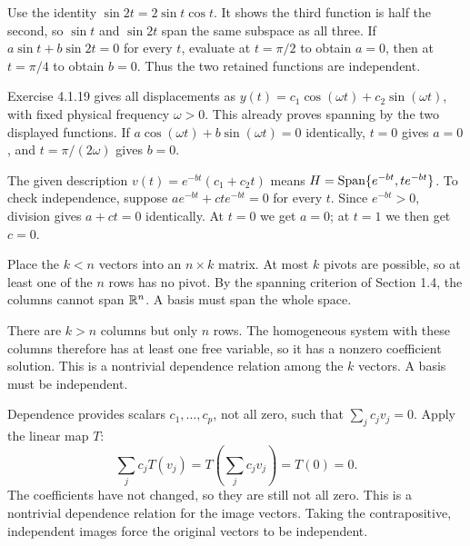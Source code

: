 Use the identity $\sin2t=2\sin t\cos t$. It shows the third function
is half the second, so $\sin t$ and $\sin2t$ span the same subspace
as all three. If $a\sin t+b\sin2t=0$ for every $t$, evaluate at
$t=\pi/2$ to obtain $a=0$, then at $t=\pi/4$ to obtain $b=0$.
Thus the two retained functions are independent.

Exercise 4.1.19 gives all displacements as
$y(t)=c_1\cos(\omega t)+c_2\sin(\omega t)$, with fixed physical
frequency $\omega>0$. This already proves spanning by the two displayed
functions. If $a\cos(\omega t)+b\sin(\omega t)=0$ identically,
$t=0$ gives $a=0$, and $t=\pi/(2\omega)$ gives $b=0$.

The given description $v(t)=e^{-bt}(c_1+c_2t)$ means
$H=\operatorname{Span}\{e^{-bt},te^{-bt}\}$. To check independence, suppose
$a e^{-bt}+c t e^{-bt}=0$ for every $t$. Since $e^{-bt}>0$,
division gives $a+ct=0$ identically. At $t=0$ we get $a=0$;
at $t=1$ we then get $c=0$.

Place the $k<n$ vectors into an $n\times k$ matrix. At most $k$
pivots are possible, so at least one of the $n$ rows has no pivot.
By the spanning criterion of Section 1.4, the columns cannot span
$\mathbb{R}^n$. A basis must span the whole space.

There are $k>n$ columns but only $n$ rows. The homogeneous system
with these columns therefore has at least one free variable, so it has
a nonzero coefficient solution. This is a nontrivial dependence relation
among the $k$ vectors. A basis must be independent.

Dependence provides scalars $c_1,\ldots,c_p$, not all zero, such that
$\sum_j c_jv_j=0$. Apply the linear map $T$:
\[
\sum_j c_jT(v_j)=T\left(\sum_j c_jv_j\right)=T(0)=0.
\]
The coefficients have not changed, so they are still not all zero.
This is a nontrivial dependence relation for the image vectors.
Taking the contrapositive, independent images force the original vectors
to be independent.

